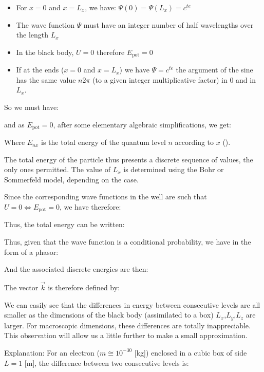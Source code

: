 	\begin{itemize}
		\item For $x=0$ and $x=L_x$, we have: $\Psi(0)=\Psi(L_x)=c^{te}$

		\item The wave function $\Psi$ must have an integer number of half wavelengths over the length $L_x$

		\item In the black body, $U=0$ therefore $E_\text{pot}=0$

		\item If at the ends ($x=0$ and $x=L_x$) we have $\Psi=c^{te}$ the argument of the sine has the same value $n2\pi$ (to a given integer multiplicative factor) in $0$ and in $L_x$.
	\end{itemize}
	So we must have:
	
	and as $E_\text{pot}=0$, after some elementary algebraic simplifications, we get:
	
	Where $E_{nx}$ is the total energy of the quantum level $n$ according to $x$ ().

	The total energy of the particle thus presents a discrete sequence of values, the only ones permitted. The value of $L_x$ is determined using the Bohr or Sommerfeld model, depending on the case.

	Since the corresponding wave functions in the well are such that $U=0\Leftrightarrow E_\text{pot}=0$, we have therefore:
	
	Thus, the total energy can be written:
	
	Thus, given that the wave function is a conditional probability, we have in the form of a phasor:
	
	And the associated discrete energies are then:
	
	The vector $\vec{k}$ is therefore defined by:
	
	\begin{tcolorbox}[title=Remark,colframe=black,arc=10pt]
	We can easily see that the differences in energy between consecutive levels are all smaller as the dimensions of the black body (assimilated to a box) $L_x$,$L_y$,$L_z$ are larger. For macroscopic dimensions, these differences are totally inappreciable. This observation will allow us a little further to make a small approximation.
	\end{tcolorbox}
	Explanation: For an electron ($m\cong 10^{-30}$ [kg]) enclosed in a cubic box of side $L=1$ [m], the difference between two consecutive levels is:
	

